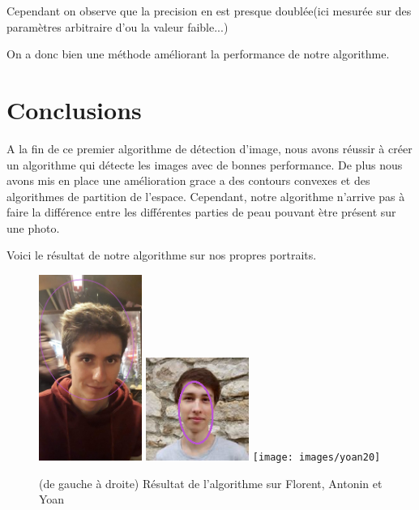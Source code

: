 \documentclass[a4paper,12pt, openany]{book}
\theoremstyle{break}
\begin{document}
Cependant on observe que la precision en est presque doublée(ici mesurée sur des paramètres arbitraire d'ou la valeur faible...)

On a donc bien une méthode améliorant la performance de notre algorithme.

\section{Conclusions}

A la fin de ce premier algorithme de détection d'image, nous avons réussir à créer un algorithme qui détecte les images avec de bonnes performance. De plus nous avons mis en place une amélioration grace a des contours convexes et des algorithmes de partition de l'espace. Cependant, notre algorithme n'arrive pas à faire la différence entre les différentes parties de peau pouvant ètre présent sur une photo.

Voici le résultat de notre algorithme sur nos propres portraits.

\begin{figure}[H]
  \includegraphics[width=0.3\textwidth]{images/florent20}\hfill
  \includegraphics[width=0.3\textwidth]{images/antonin20}\hfill
  \texttt{[image: images/yoan20]}\hfill
  \caption{(de gauche à droite) Résultat de l'algorithme sur Florent, Antonin et Yoan}
  \label{fig:nous}
\end{figure}
\end{document}
